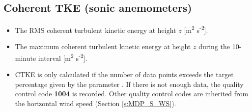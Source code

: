 \subsection{Coherent TKE (sonic anemometers)} 
\begin{itemize}
\item {} The RMS coherent turbulent kinetic energy at height $z$ [m\textsuperscript{2} s\textsuperscript{-2}]. 
\item {} The maximum coherent turbulent kinetic energy at height $z$ during the 10-minute interval [m\textsuperscript{2} s\textsuperscript{-2}].
\item {} CTKE is only calculated if the number of data points exceeds the target percentage given by the parameter . If there is not enough data, the quality control code \textbf{1004} is recorded. Other quality control codes are inherited from the horizontal wind speed (Section \ref{s:MDP_S_WS}).
\end{itemize}

